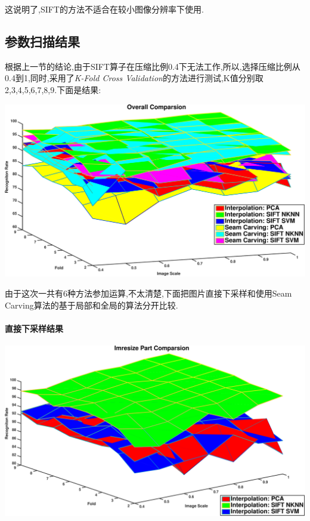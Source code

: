这说明了,SIFT的方法不适合在较小图像分辨率下使用.

\subsection{参数扫描结果}
根据上一节的结论,由于SIFT算子在压缩比例0.4下无法工作,所以,选择压缩比例从0.4到1,同时,采用了\textit{K-Fold Cross Validation}的方法进行测试,K值分别取2,3,4,5,6,7,8,9.下面是结果: \newline

\begin{center}
\begin{minipage}[t]{\linewidth}
\center
{
\captionsetup{justification=centering}
\includegraphics[width=\textwidth]{Img/c4/glo_comp} 
}
\end{minipage}
\medskip
\end{center}

由于这次一共有6种方法参加运算,不太清楚,下面把图片直接下采样和使用Seam Carving算法的基于局部和全局的算法分开比较.

\paragraph{直接下采样结果}
\begin{center}
\begin{minipage}[t]{\linewidth}
\center
{
\captionsetup{justification=centering}
\includegraphics[width=\textwidth]{Img/c4/glo_comp_imresize} 
}
\end{minipage}
\medskip
\end{center}

